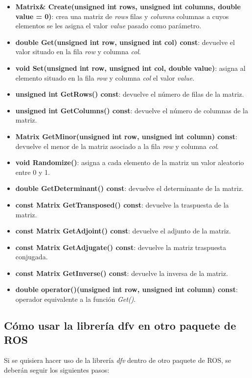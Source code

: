 \documentclass[12pt, a4paper]{report}
\begin{document}
\begin{itemize}
\item \textbf{Matrix\& Create(unsigned int rows, unsigned int columns, double value = 0)}: crea una matriz de \textit{rows} filas y \textit{columns} columnas a cuyos elementos se les asigna el valor \textit{value} pasado como parámetro.
\item \textbf{double Get(unsigned int row, unsigned int col) const}: devuelve el valor situado en la fila \textit{row} y columna \textit{col}.
\item \textbf{void Set(unsigned int row, unsigned int col, double value)}: asigna al elemento situado en la fila \textit{row} y columna \textit{col} el valor \textit{value}.
\item \textbf{unsigned int GetRows() const}: devuelve el número de filas de la matriz.
\item \textbf{unsigned int GetColumns() const}: devuelve el número de columnas de la matriz.
\item \textbf{Matrix GetMinor(unsigned int row, unsigned int column) const}: devuelve el menor de la matriz asociado a la fila \textit{row} y columna \textit{col}.
\item \textbf{void Randomize()}: asigna a cada elemento de la matriz un valor aleatorio entre 0 y 1.
\item \textbf{double GetDeterminant() const}: devuelve el determinante de la matriz.
\item \textbf{const Matrix GetTransposed() const}: devuelve la traspuesta de la matriz.
\item \textbf{const Matrix GetAdjoint() const}: devuelve el adjunto de la matriz.
\item \textbf{const Matrix GetAdjugate() const}: devuelve la matriz traspuesta conjugada.
\item \textbf{const Matrix GetInverse() const}: devuelve la inversa de la matriz.
\item \textbf{double operator()(unsigned int row, unsigned int column) const}: operador equivalente a la función \textit{Get()}.

\end{itemize}

\subsection{Cómo usar la librería dfv en otro paquete de ROS}

Si se quisiera hacer uso de la librería \textit{dfv} dentro de otro paquete de ROS, se deberán seguir los siguientes pasos:
\end{document}
